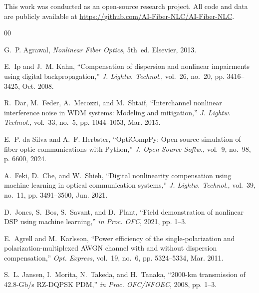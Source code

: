 \documentclass[conference]{IEEEtran}
\begin{document}
This work was conducted as an open-source research project. All code and data are publicly available at \url{https://github.com/AI-Fiber-NLC/AI-Fiber-NLC}.

\begin{thebibliography}{00}

G.~P. Agrawal, \emph{Nonlinear Fiber Optics}, 5th~ed. Elsevier, 2013.

E.~Ip and J.~M. Kahn, ``Compensation of dispersion and nonlinear impairments using digital backpropagation,'' \emph{J. Lightw. Technol.}, vol.~26, no.~20, pp. 3416--3425, Oct. 2008.

R.~Dar, M.~Feder, A.~Mecozzi, and M.~Shtaif, ``Interchannel nonlinear interference noise in WDM systems: Modeling and mitigation,'' \emph{J. Lightw. Technol.}, vol.~33, no.~5, pp. 1044--1053, Mar. 2015.

E.~P. da Silva and A.~F. Herbster, ``OptiCompPy: Open-source simulation of fiber optic communications with Python,'' \emph{J. Open Source Softw.}, vol.~9, no.~98, p. 6600, 2024.

A.~Feki, D.~Che, and W.~Shieh, ``Digital nonlinearity compensation using machine learning in optical communication systems,'' \emph{J. Lightw. Technol.}, vol.~39, no.~11, pp. 3491--3500, Jun. 2021.

D.~Jones, S.~Bos, S.~Savant, and D.~Plant, ``Field demonstration of nonlinear DSP using machine learning,'' \emph{in Proc. OFC}, 2021, pp. 1--3.

E.~Agrell and M.~Karlsson, ``Power efficiency of the single-polarization and polarization-multiplexed AWGN channel with and without dispersion compensation,'' \emph{Opt. Express}, vol.~19, no.~6, pp. 5324--5334, Mar. 2011.

S.~L. Jansen, I.~Morita, N.~Takeda, and H.~Tanaka, ``2000-km transmission of 42.8-Gb/s RZ-DQPSK PDM,'' \emph{in Proc. OFC/NFOEC}, 2008, pp. 1--3.

\end{thebibliography}
\end{document}
